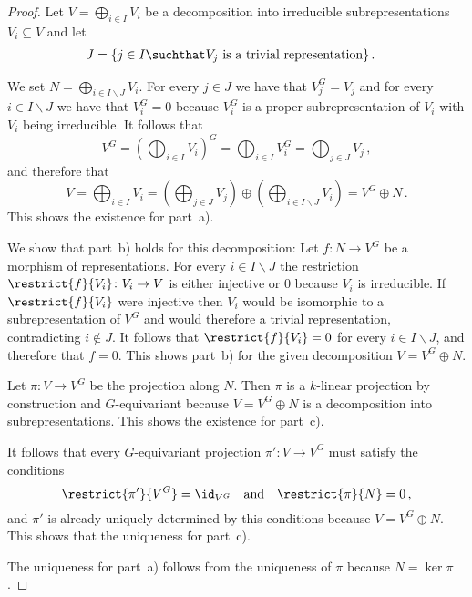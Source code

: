 \begin{proof}
  Let $V = \bigoplus_{i \in I} V_i$ be a decomposition into irreducible subrepresentations $V_i \subseteq V$ and let
  \begin{align*}
        J
    &=  \{
          j \in I
        \suchthat
          \text{$V_j$ is a trivial representation}
        \} \,.
  \end{align*}
  
  We set $N = \bigoplus_{i \in I \smallsetminus J} V_i$.
  For every $j \in J$ we have that $V_j^G = V_j$ and for every $i \in I \smallsetminus J$ we have that $V_i^G = 0$ because $V_i^G$ is a proper subrepresentation of $V_i$ with $V_i$ being irreducible.
  It follows that
  \[
      V^G
    = \left( \bigoplus_{i \in I} V_i \right)^G
    = \bigoplus_{i \in I} V_i^G
    = \bigoplus_{j \in J} V_j \,,
  \]
  and therefore that
  \[
      V
    = \bigoplus_{i \in I} V_i
    = \left( \bigoplus_{j \in J} V_j \right)
      \oplus
      \left( \bigoplus_{i \in I \smallsetminus J} V_i \right)
    = V^G \oplus N \,.
  \]
  This shows the existence for part~a).
  
  We show that part~b) holds for this decomposition:
  Let $f \colon N \to V^G$ be a morphism of representations.
  For every $i \in I \smallsetminus J$ the restriction $\restrict{f}{V_i} \colon V_i \to V$ is either injective or $0$ because $V_i$ is irreducible.
  If $\restrict{f}{V_i}$ were injective then $V_i$ would be isomorphic to a subrepresentation of $V^G$ and would therefore a trivial representation, contradicting $i \notin J$.
  It follows that $\restrict{f}{V_i} = 0$ for every $i \in I \smallsetminus J$, and therefore that $f = 0$.
  This shows part~b) for the given decomposition $V = V^G \oplus N$.
  
  Let $\pi \colon V \to V^G$ be the projection along $N$.
  Then $\pi$ is a $k$-linear projection by construction and $G$-equivariant because $V = V^G \oplus N$ is a decomposition into subrepresentations.
  This shows the existence for part~c).
  
  It follows that every $G$-equivariant projection $\pi' \colon V \to V^G$ must satisfy the conditions
  \[
      \restrict{\pi'}{V^G}
    = \id_{V^G}
    \quad\text{and}\quad
      \restrict{\pi}{N}
    = 0 \,,
  \]
  and $\pi'$ is already uniquely determined by this conditions because $V = V^G \oplus N$.
  This shows that the uniqueness for part~c).
  
  The uniqueness for part~a) follows from the uniqueness of $\pi$ because $N = \ker \pi$.
\end{proof}


